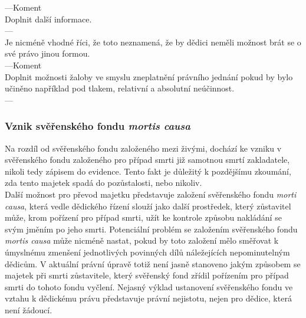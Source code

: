 \documentclass{article}
\begin{document}
---Koment\\
Doplnit další informace.\\
---\\
Je nicméně vhodné říci, že toto neznamená, že by dědici neměli možnost brát se o své právo jinou formou.\\
---Koment\\
Doplnit možnosti žaloby ve smyslu zneplatnění právního jednání pokud by bylo učiněno například pod tlakem, relativní a absolutní neúčinnost.\\
---\\

\newpage
\thispagestyle{smallertextinheader}

\subsubsection{Vznik svěřenského fondu \textit{mortis causa}}

Na rozdíl od svěřenského fondu založeného mezi živými, dochází ke vzniku v svěřenského fondu založeného pro případ smrti již samotnou smrtí zakladatele, nikoli tedy zápisem do evidence. Tento fakt je důležitý k pozdějšímu zkoumání, zda tento majetek spadá do pozůstalosti, nebo nikoliv.\\

Další možnost pro převod majetku představuje založení svěřenského fondu \textit{morti causa}, která vedle dědického řízení slouží jako další prostředek, který zůstavitel může, krom pořízení pro případ smrti, užít ke kontrole způsobu nakládání se svým jměním po jeho smrti. Potenciální problém se založením svěřenského fondu \textit{mortis causa} může nicméně nastat, pokud by toto založení mělo směřovat k úmyslnému zmenšení jednotlivých povinných dílů náležejících nepominutelným dědicům. V aktuální právní úpravě totiž není jasně stanoveno jakým způsobem se majetek při smrti zůstavitele, který svěřenský fond zřídil pořízením pro případ smrti do tohoto fondu vyčlení. Nejasný výklad ustanovení svěřenského fondu ve vztahu k dědickému právu představuje právní nejistotu, nejen pro dědice, která není žádoucí. \\
\end{document}
